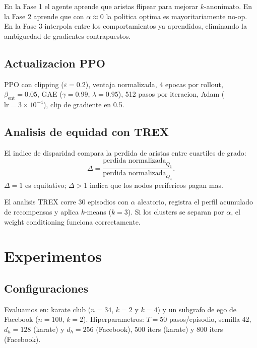 \documentclass[10pt,twocolumn,letterpaper]{article}
\newcommand{\Ddelta}{\Delta}
\begin{document}
En la Fase 1 el agente aprende que aristas flipear para mejorar $k$-anonimato. En la
Fase 2 aprende que con $\alpha\approx 0$ la politica optima es mayoritariamente no-op.
En la Fase 3 interpola entre los comportamientos ya aprendidos, eliminando la
ambiguedad de gradientes contrapuestos.

\subsection{Actualizacion PPO}

PPO con clipping ($\varepsilon=0.2$), ventaja normalizada, 4 epocas por rollout,
$\beta_{\text{ent}}=0.05$, GAE ($\gamma=0.99$, $\lambda=0.95$), 512 pasos por
iteracion, Adam ($\text{lr}=3\times10^{-4}$), clip de gradiente en 0.5.

\subsection{Analisis de equidad con TREX}

El indice de disparidad compara la perdida de aristas entre cuartiles de grado:
\begin{equation}
  \Ddelta = \frac{\text{perdida normalizada}_{Q_1}}{\text{perdida normalizada}_{Q_4}}.
\end{equation}
$\Ddelta=1$ es equitativo; $\Ddelta>1$ indica que los nodos perifericos pagan mas.

El analisis TREX \citep{Rajapakse2026} corre 30 episodios con $\alpha$ aleatorio,
registra el perfil acumulado de recompensas y aplica $k$-means ($k=3$). Si los
clusters se separan por $\alpha$, el weight conditioning funciona correctamente.

\section{Experimentos}

\subsection{Configuraciones}

Evaluamos en: karate club \citep{Zachary1977} ($n=34$, $k=2$ y $k=4$) y un subgrafo
de ego de Facebook \citep{Leskovec2012} ($n=100$, $k=2$). Hiperparametros: $T=50$
pasos/episodio, semilla 42, $d_h=128$ (karate) y $d_h=256$ (Facebook), 500 iters
(karate) y 800 iters (Facebook).
\end{document}
